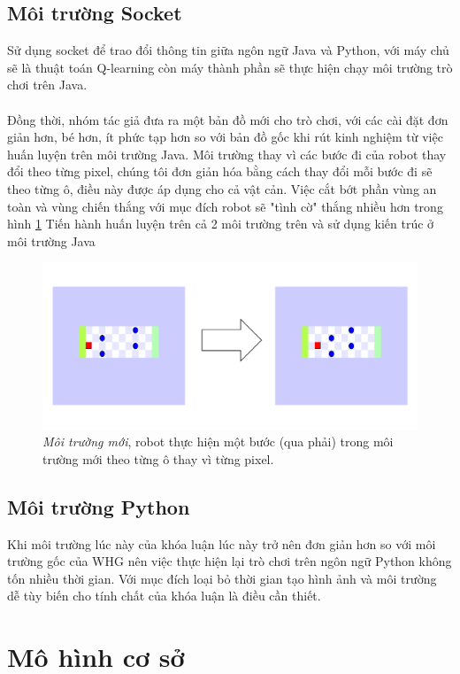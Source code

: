 \subsection{Môi trường Socket}
Sử dụng socket\cite{5232440} để trao đổi thông tin giữa ngôn ngữ Java và Python, với máy chủ sẽ là thuật toán Q-learning còn máy thành phần sẽ thực hiện chạy môi trường trò chơi trên Java. \\
\\
Đồng thời, nhóm tác giả đưa ra một bản đồ mới cho trò chơi, với các cài đặt đơn giản hơn, bé hơn, ít phức tạp hơn so với bản đồ gốc khi rút kinh nghiệm từ việc huấn luyện trên môi trường Java. Môi trường thay vì các bước đi của robot thay đổi theo từng pixel, chúng tôi đơn giản hóa bằng cách thay đổi mỗi bước đi sẽ theo từng ô, điều này được áp dụng cho cả vật cản. Việc cắt bớt phần vùng an toàn và vùng chiến thắng với mục đích robot sẽ "tình cờ" thắng nhiều hơn trong hình \ref{fig:1_step_new_env}
Tiến hành huấn luyện trên cả 2 môi trường trên và sử dụng kiến trúc ở môi trường Java
\begin{figure}[h]
    \centering
    \includegraphics[width=150mm,scale=0.5]{Pic/1_step_new_env.pdf}
    \caption[Môi trường mới]{\textit{Môi trường mới}, robot thực hiện một bước (qua phải) trong môi trường mới theo từng ô thay vì từng pixel.}
    \label{fig:1_step_new_env}
\end{figure}
\subsection{Môi trường Python}
Khi môi trường lúc này của khóa luận lúc này trở nên đơn giản hơn so với môi trường gốc của WHG nên việc thực hiện lại  trò chơi trên ngôn ngữ Python không tốn nhiều thời gian. Với mục đích loại bỏ thời gian tạo hình ảnh và môi trường dễ tùy biến cho tính chất của khóa luận là điều cần thiết.\\
\section{Mô hình cơ sở}\label{baseline_model}
